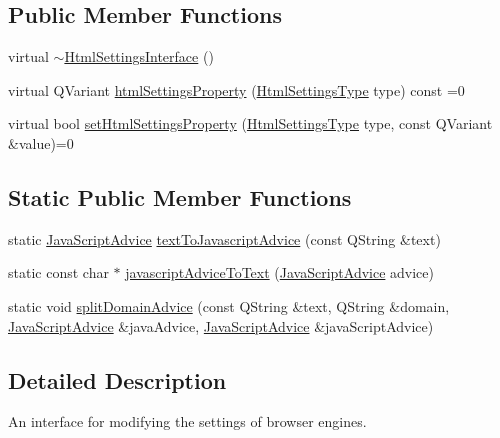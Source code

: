 \subsection*{Public Member Functions}
\begin{DoxyCompactItemize}
\item 
virtual \hyperlink{classKParts_1_1HtmlSettingsInterface_a044f53f15e82bc3c209d578849812cfd}{$\sim$\+Html\+Settings\+Interface} ()
\item 
virtual Q\+Variant \hyperlink{classKParts_1_1HtmlSettingsInterface_a00b2a2f9ce6f7b505ab0bbfa4f71eca5}{html\+Settings\+Property} (\hyperlink{classKParts_1_1HtmlSettingsInterface_a62e44360376f423604c5c838ec0e312f}{Html\+Settings\+Type} type) const =0
\item 
virtual bool \hyperlink{classKParts_1_1HtmlSettingsInterface_ad345737d10028b838bb1324568d813f3}{set\+Html\+Settings\+Property} (\hyperlink{classKParts_1_1HtmlSettingsInterface_a62e44360376f423604c5c838ec0e312f}{Html\+Settings\+Type} type, const Q\+Variant \&value)=0
\end{DoxyCompactItemize}
\subsection*{Static Public Member Functions}
\begin{DoxyCompactItemize}
\item 
static \hyperlink{classKParts_1_1HtmlSettingsInterface_af6b2303d6834ceff4d5251e10bd9d54b}{Java\+Script\+Advice} \hyperlink{classKParts_1_1HtmlSettingsInterface_a6c0aaecc231a6005d37e7c4702f6d302}{text\+To\+Javascript\+Advice} (const Q\+String \&text)
\item 
static const char $\ast$ \hyperlink{classKParts_1_1HtmlSettingsInterface_a4f165269160ae72578b0c3c5a1fca22b}{javascript\+Advice\+To\+Text} (\hyperlink{classKParts_1_1HtmlSettingsInterface_af6b2303d6834ceff4d5251e10bd9d54b}{Java\+Script\+Advice} advice)
\item 
static void \hyperlink{classKParts_1_1HtmlSettingsInterface_a116a4f8ec62c3558ff75ae8099a2e030}{split\+Domain\+Advice} (const Q\+String \&text, Q\+String \&domain, \hyperlink{classKParts_1_1HtmlSettingsInterface_af6b2303d6834ceff4d5251e10bd9d54b}{Java\+Script\+Advice} \&java\+Advice, \hyperlink{classKParts_1_1HtmlSettingsInterface_af6b2303d6834ceff4d5251e10bd9d54b}{Java\+Script\+Advice} \&java\+Script\+Advice)
\end{DoxyCompactItemize}


\subsection{Detailed Description}
An interface for modifying the settings of browser engines. 

